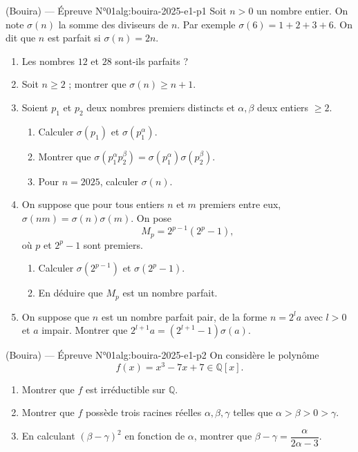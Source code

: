 \begin{problem}{(Bouira) — Épreuve N°01}{alg:bouira-2025-e1-p1}
Soit $n > 0$ un nombre entier. On note $\sigma(n)$ la somme des diviseurs de $n$.
Par exemple $\sigma(6) = 1+2+3+6$. On dit que $n$ est parfait si $\sigma(n) = 2n$.
\begin{enumerate}
\item Les nombres $12$ et $28$ sont-ils parfaits ?
\item Soit $n \geq 2$ ; montrer que $\sigma(n) \geq n + 1$.
\item Soient $p_1$ et $p_2$ deux nombres premiers distincts et $\alpha, \beta$ deux
      entiers $\geq 2$.
      \begin{enumerate}
      \item Calculer $\sigma(p_1)$ et $\sigma(p_1^\alpha)$.
      \item Montrer que $\sigma(p_1^\alpha p_2^\beta) = \sigma(p_1^\alpha)\sigma(p_2^\beta)$.
      \item Pour $n = 2025$, calculer $\sigma(n)$.
      \end{enumerate}
\item On suppose que pour tous entiers $n$ et $m$ premiers entre eux,
      $\sigma(nm) = \sigma(n)\sigma(m)$. On pose
      $$
      M_p = 2^{p-1}(2^p - 1),
      $$
      où $p$ et $2^p - 1$ sont premiers.
      \begin{enumerate}
      \item Calculer $\sigma(2^{p-1})$ et $\sigma(2^p - 1)$.
      \item En déduire que $M_p$ est un nombre parfait.
      \end{enumerate}
\item On suppose que $n$ est un nombre parfait pair, de la forme $n = 2^l a$ avec
      $l > 0$ et $a$ impair. Montrer que $2^{l+1} a = (2^{l+1} - 1)\sigma(a)$.
\end{enumerate}

\end{problem}

\newpage

\begin{problem}{(Bouira) — Épreuve N°01}{alg:bouira-2025-e1-p2}
On considère le polynôme
$$
f(x) = x^3 - 7x + 7 \in \mathbb{Q}[x].
$$
\begin{enumerate}
\item Montrer que $f$ est irréductible sur $\mathbb{Q}$.
\item Montrer que $f$ possède trois racines réelles $\alpha, \beta, \gamma$ telles que
      $\alpha > \beta > 0 > \gamma$.
\item En calculant $(\beta - \gamma)^2$ en fonction de $\alpha$, montrer que
      $\beta - \gamma = \dfrac{\alpha}{2\alpha - 3}$.
\end{enumerate}

\end{problem}

